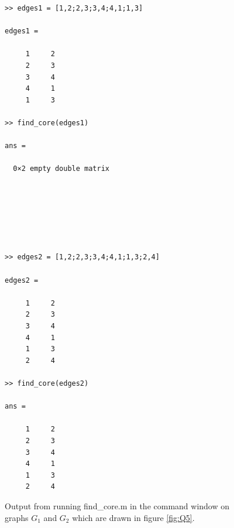 \documentclass[a4paper]{article}
\begin{document}
\begin{figure}[H]
    \centering
    \begin{minipage}{0.48\textwidth}
        \centering
        \begin{verbatim}
>> edges1 = [1,2;2,3;3,4;4,1;1,3]

edges1 =

     1     2
     2     3
     3     4
     4     1
     1     3

>> find_core(edges1)

ans =

  0×2 empty double matrix
  
  
  
  
  
  
        \end{verbatim}
    \end{minipage}\hfill
    \begin{minipage}{0.48\textwidth}
        \centering
        \begin{verbatim}
>> edges2 = [1,2;2,3;3,4;4,1;1,3;2,4]

edges2 =

     1     2
     2     3
     3     4
     4     1
     1     3
     2     4

>> find_core(edges2)

ans =

     1     2
     2     3
     3     4
     4     1
     1     3
     2     4
        \end{verbatim}
    \end{minipage}
    \caption{Output from running find\_core.m in the command window on graphs $G_1$ and $G_2$ which are drawn in figure \ref{fig:Q5}.}
    \label{fig:Q5code}
\end{figure}
\end{document}
